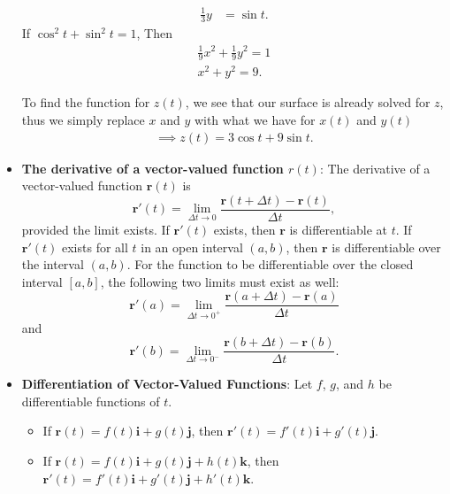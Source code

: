 \documentclass{report}
\begin{document}
\begin{itemize}
\begin{prop}
\begin{align*}
                   \frac{1}{3}y&=\sin{t}
               .\end{align*}
               If $\cos^{2}{t} + \sin^{2}{t} = 1 $, Then
               \begin{align*}
                   \frac{1}{9}x^{2} + \frac{1}{9}y^{2} = 1 \\
                   x^{2} + y^{2} = 9
               .\end{align*}
           \end{prop}
           To find the function for $z(t)$, we see that our surface is already solved for $z$, thus we simply replace $x$ and $y$ with what we have for $x(t)$ and $y(t)$
           \begin{align*}
               \implies z(t) = 3\cos{t} + 9 \sin{t}
           .\end{align*}
       \item \textbf{The derivative of a vector-valued function $r(t)$}:
           The derivative of a vector-valued function $\mathbf{r}(t)$ is
           \begin{equation}
               \mathbf{r}'(t) = \lim_{\Delta t \to 0} \frac{\mathbf{r}(t + \Delta t) - \mathbf{r}(t)}{\Delta t},
           \end{equation}
           provided the limit exists. If $\mathbf{r}'(t)$ exists, then $\mathbf{r}$ is differentiable at $t$. If $\mathbf{r}'(t)$ exists for all $t$ in an open interval $(a, b)$, then $\mathbf{r}$ is differentiable over the interval $(a, b)$. For the function to be differentiable over the closed interval $[a, b]$, the following two limits must exist as well:
           \begin{equation}
               \mathbf{r}'(a) = \lim_{\Delta t \to 0^+} \frac{\mathbf{r}(a + \Delta t) - \mathbf{r}(a)}{\Delta t}
           \end{equation}
           and
           \begin{equation}
               \mathbf{r}'(b) = \lim_{\Delta t \to 0^-} \frac{\mathbf{r}(b + \Delta t) - \mathbf{r}(b)}{\Delta t}.
           \end{equation}
       \item \textbf{Differentiation of Vector-Valued Functions}:
           Let $f$, $g$, and $h$ be differentiable functions of $t$.
           \begin{itemize}
               \item If $\mathbf{r}(t) = f(t)\mathbf{i} + g(t)\mathbf{j}$, then $\mathbf{r}'(t) = f'(t)\mathbf{i} + g'(t)\mathbf{j}$.
               \item If $\mathbf{r}(t) = f(t)\mathbf{i} + g(t)\mathbf{j} + h(t)\mathbf{k}$, then $\mathbf{r}'(t) = f'(t)\mathbf{i} + g'(t)\mathbf{j} + h'(t)\mathbf{k}$.

\end{itemize}
\end{itemize}
\end{document}
